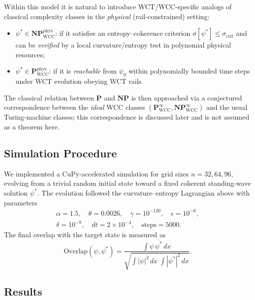 \documentclass[12pt]{article}
\theoremstyle{remark}
\begin{document}
Within this model it is natural to introduce WCT/WCC-specific analogs of classical
complexity classes in the \emph{physical} (rail-constrained) setting:
\begin{itemize}
  \item \( \psi^* \in \mathbf{NP}_{\mathrm{WCC}}^{\mathrm{phys}} \): if it satisfies an entropy–coherence criterion
        \( \sigma[\psi^*] \leq \sigma_{\text{crit}} \) and can be \emph{verified}
        by a local curvature/entropy test in polynomial physical resources;
  \item \( \psi^* \in \mathbf{P}_{\mathrm{WCC}}^{\mathrm{phys}} \): if it is \emph{reachable}
        from \( \psi_0 \) within polynomially bounded time steps
        under WCT evolution obeying WCT rails.
\end{itemize}
The classical relation between \( \mathbf{P} \) and \( \mathbf{NP} \) is then
approached via a conjectured correspondence between the \emph{ideal} WCC classes
\((\mathbf{P}_{\mathrm{WCC}}^{\infty},\mathbf{NP}_{\mathrm{WCC}}^{\infty})\) and the usual
Turing-machine classes; this correspondence is discussed later and is not
assumed as a theorem here.

\subsection{Simulation Procedure}

We implemented a CuPy-accelerated simulation for grid sizes \( n = 32, 64, 96 \),
evolving from a trivial random initial state toward a fixed coherent standing-wave
solution \( \psi^* \). The evolution followed the curvature–entropy Lagrangian
above with parameters
\[
\begin{gathered}
\alpha=1.5,\quad \theta=0.0026,\quad \gamma=10^{-120},\quad \epsilon=10^{-6},\\
\delta=10^{-8},\quad dt=2\times10^{-4},\quad \text{steps}=5000.
\end{gathered}
\]
The final overlap with the target state is measured as
\begin{equation}
\mathrm{Overlap}(\psi, \psi^*) =
\frac{\displaystyle \int \psi \,\overline{\psi^*}\, dx}{\sqrt{\displaystyle \int |\psi|^2\, dx \;\int |\psi^*|^2\, dx}}.
\end{equation}

\subsection{Results}
\end{document}

